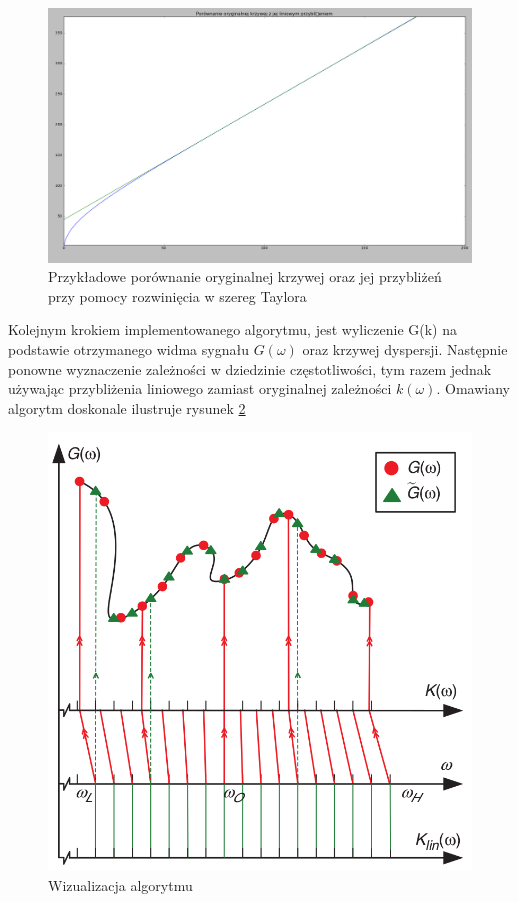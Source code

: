 \begin{figure}[h]
\centering
\includegraphics[width=14cm]{Zdjecia/4/krzywa_moja}
\caption{Przykładowe porównanie oryginalnej krzywej oraz jej przybliżeń przy pomocy rozwinięcia w szereg Taylora}
\label{fig:krzywa_moja}
\end{figure}

Kolejnym krokiem implementowanego algorytmu, jest wyliczenie G(k) na podstawie otrzymanego widma sygnału $G(\omega)$ oraz krzywej dyspersji. Następnie ponowne wyznaczenie zależności w dziedzinie częstotliwości, tym razem jednak używając przybliżenia liniowego zamiast oryginalnej zależności $k(\omega)$. Omawiany algorytm doskonale ilustruje rysunek \ref{fig:algo_Taylora}

\begin{figure}[h]
\centering
\includegraphics[width=13cm]{Zdjecia/4/algo_Taylora}
\caption{Wizualizacja algorytmu \cite{kasia5}}
\label{fig:algo_Taylora}
\end{figure}

